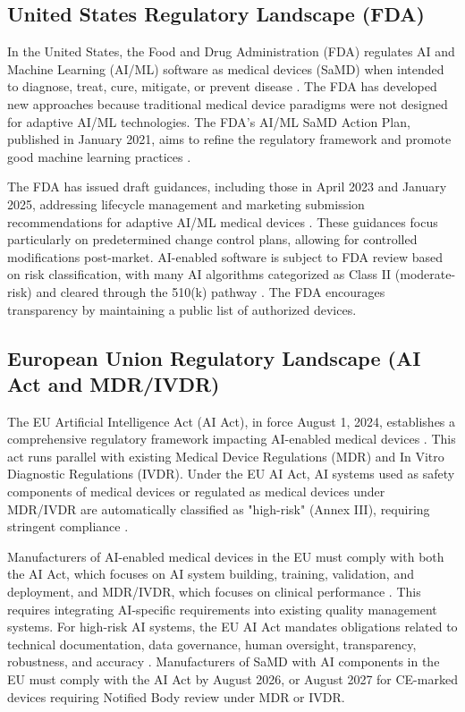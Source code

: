 \documentclass[12pt,a4paper]{article}
\begin{document}
\subsection{United States Regulatory Landscape (FDA)}
\label{subsec:us-regulation}
In the United States, the Food and Drug Administration (FDA) regulates AI and Machine Learning (AI/ML) software as medical devices (SaMD) when intended to diagnose, treat, cure, mitigate, or prevent disease \cite{fda_ai_ml_samd}. The FDA has developed new approaches because traditional medical device paradigms were not designed for adaptive AI/ML technologies. The FDA's AI/ML SaMD Action Plan, published in January 2021, aims to refine the regulatory framework and promote good machine learning practices \cite{fda_ai_ml_samd}.

The FDA has issued draft guidances, including those in April 2023 and January 2025, addressing lifecycle management and marketing submission recommendations for adaptive AI/ML medical devices \cite{fda_ai_ml_samd}. These guidances focus particularly on predetermined change control plans, allowing for controlled modifications post-market. AI-enabled software is subject to FDA review based on risk classification, with many AI algorithms categorized as Class II (moderate-risk) and cleared through the 510(k) pathway \cite{fda_ai_ml_samd}. The FDA encourages transparency by maintaining a public list of authorized devices.

\subsection{European Union Regulatory Landscape (AI Act and MDR/IVDR)}
\label{subsec:eu-regulation}
The EU Artificial Intelligence Act (AI Act), in force August 1, 2024, establishes a comprehensive regulatory framework impacting AI-enabled medical devices \cite{regdesk_eu_ai_act}. This act runs parallel with existing Medical Device Regulations (MDR) and In Vitro Diagnostic Regulations (IVDR). Under the EU AI Act, AI systems used as safety components of medical devices or regulated as medical devices under MDR/IVDR are automatically classified as "high-risk" (Annex III), requiring stringent compliance \cite{regdesk_eu_ai_act}.

Manufacturers of AI-enabled medical devices in the EU must comply with both the AI Act, which focuses on AI system building, training, validation, and deployment, and MDR/IVDR, which focuses on clinical performance \cite{regdesk_eu_ai_act}. This requires integrating AI-specific requirements into existing quality management systems. For high-risk AI systems, the EU AI Act mandates obligations related to technical documentation, data governance, human oversight, transparency, robustness, and accuracy \cite{regdesk_eu_ai_act}. Manufacturers of SaMD with AI components in the EU must comply with the AI Act by August 2026, or August 2027 for CE-marked devices requiring Notified Body review under MDR or IVDR.
\end{document}
